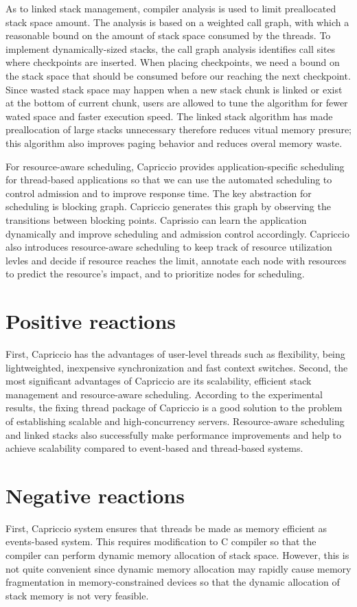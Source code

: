\documentclass[10pt, letterpaper]{article}
\begin{document}
As to linked stack management, compiler analysis is used to limit preallocated stack space amount. The analysis
is based on a weighted call graph, with which a reasonable bound on the amount of stack space consumed by the
threads. To implement dynamically-sized stacks, the call graph analysis identifies call sites where checkpoints
are inserted. When placing checkpoints, we need a bound on the stack space that should be consumed before our
reaching the next checkpoint. Since wasted stack space may happen when a new stack chunk is linked or exist at
the bottom of current chunk, users are allowed to tune the algorithm for fewer wated space and faster execution
speed. The linked stack algorithm has made preallocation of large stacks unnecessary therefore reduces vitual
memory presure; this algorithm also improves paging behavior and reduces overal memory waste.

For resource-aware scheduling, Capriccio provides application-specific scheduling for thread-based applications
so that we can use the automated scheduling to control admission and to improve response time. The key
abstraction for scheduling is blocking graph. Capriccio generates this graph by observing the transitions between
blocking points. Caprissio can learn the application dynamically and improve scheduling and admission control
accordingly. Capriccio also introduces resource-aware scheduling to keep track of resource utilization levles and
decide if resource reaches the limit, annotate each node with resources to predict the resource's impact, and to
prioritize nodes for scheduling.

\section{Positive reactions}
First, Capriccio has the advantages of user-level threads such as flexibility, being lightweighted, inexpensive
synchronization and fast context switches. Second, the most significant advantages of Capriccio are its scalability, efficient stack management and resource-aware
scheduling. According to the experimental results, the fixing thread package of Capriccio is a good solution to
the problem of establishing scalable and high-concurrency servers. Resource-aware scheduling and linked stacks
also successfully make performance improvements and help to achieve scalability compared to event-based and
thread-based systems. 

\section{Negative reactions}
First, Capriccio system ensures that threads be made as memory efficient as events-based system. This requires
modification to C compiler so that the compiler can perform dynamic memory allocation of stack space. However,
this is not quite convenient since dynamic memory allocation may rapidly cause memory fragmentation in
memory-constrained devices so that the dynamic allocation of stack memory is not very feasible. 
\end{document}
